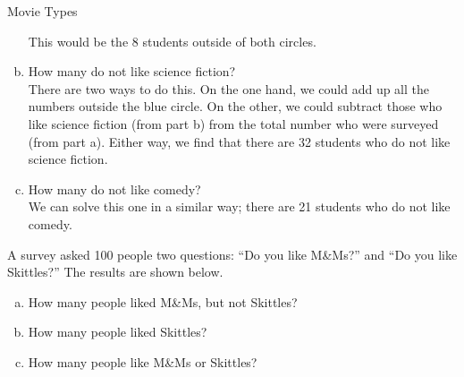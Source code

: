 \begin{example}[https://www.youtube.com/watch?v=Nkay8g-5suM]{Movie Types}
\begin{enumerate}[(a)]
This would be the 8 students outside of both circles.\\

\item How many do not like science fiction?\\

There are two ways to do this.  On the one hand, we could add up all the numbers outside the blue circle.  On the other, we could subtract those who like science fiction (from part b) from the total number who were surveyed (from part a).  Either way, we find that there are 32 students who do not like science fiction.\\

\item How many do not like comedy?\\

We can solve this one in a similar way; there are 21 students who do not like comedy.
\end{enumerate}
\end{example}

\begin{try}
A survey asked 100 people two questions: ``Do you like M\&Ms?'' and ``Do you like Skittles?''  The results are shown below.

\begin{center}
\end{center}

\begin{enumerate}[(a)]
\item How many people liked M\&Ms, but not Skittles?
\item How many people liked Skittles?
\item How many people like M\&Ms or Skittles?
\end{enumerate}
\end{try}

